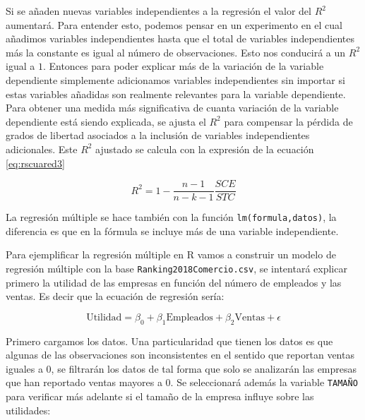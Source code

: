 \documentclass[]{book}
\newenvironment{Shaded}{\begin{snugshade}}{\end{snugshade}}
\newcommand{\DataTypeTok}[1]{\textcolor[rgb]{0.13,0.29,0.53}{#1}}
\newcommand{\DecValTok}[1]{\textcolor[rgb]{0.00,0.00,0.81}{#1}}
\newcommand{\KeywordTok}[1]{\textcolor[rgb]{0.13,0.29,0.53}{\textbf{#1}}}
\newcommand{\NormalTok}[1]{#1}
\newcommand{\OperatorTok}[1]{\textcolor[rgb]{0.81,0.36,0.00}{\textbf{#1}}}
\newcommand{\OtherTok}[1]{\textcolor[rgb]{0.56,0.35,0.01}{#1}}
\newcommand{\StringTok}[1]{\textcolor[rgb]{0.31,0.60,0.02}{#1}}
\begin{document}
Si se añaden nuevas variables independientes a la regresión el valor del \(R^2\) aumentará. Para entender esto, podemos pensar en un experimento en el cual añadimos variables independientes hasta que el total de variables independientes más la constante es igual al número de observaciones. Esto nos conducirá a un \(R^2\) igual a \(1\). Entonces para poder explicar más de la variación de la variable dependiente simplemente adicionamos variables independientes sin importar si estas variables añadidas son realmente relevantes para la variable dependiente. Para obtener una medida más significativa de cuanta variación de la variable dependiente está siendo explicada, se ajusta el \(R^2\) para compensar la pérdida de grados de libertad asociados a la inclusión de variables independientes adicionales. Este \(R^2\) ajustado se calcula con la expresión de la ecuación \eqref{eq:rscuared3}

\begin{equation}
R^2 = 1 -\dfrac{n-1}{n-k-1} \dfrac{SCE}{STC}
    \label{eq:rscuared3}
\end{equation}

La regresión múltiple se hace también con la función \texttt{lm(formula,datos)}, la diferencia es que en la fórmula se incluye más de una variable independiente.

Para ejemplificar la regresión múltiple en R vamos a construir un modelo de regresión múltiple con la base \texttt{Ranking2018Comercio.csv}, se intentará explicar primero la utilidad de las empresas en función del número de empleados y las ventas. Es decir que la ecuación de regresión sería:

\begin{equation}
  \text{Utilidad} = \beta_0 + \beta_1 \text{Empleados} + \beta_2 \text{Ventas} + \epsilon
    \label{eq:modelo2}
\end{equation}

Primero cargamos los datos. Una particularidad que tienen los datos es que algunas de las observaciones son inconsistentes en el sentido que reportan ventas iguales a 0, se filtrarán los datos de tal forma que solo se analizarán las empresas que han reportado ventas mayores a 0. Se seleccionará además la variable \texttt{TAMAÑO} para verificar más adelante si el tamaño de la empresa influye sobre las utilidades:

\begin{Shaded}
\end{Shaded}
\end{document}
